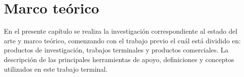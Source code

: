 \chapter{Marco teórico}
En el presente capítulo se realiza la investigación correspondiente al estado del arte y marco teórico, comenzando con el trabajo previo el cuál está dividido en: productos de investigación, trabajos terminales y productos comerciales. La descripción de las principales herramientas de apoyo, definiciones y 
conceptos utilizados en este trabajo terminal.






